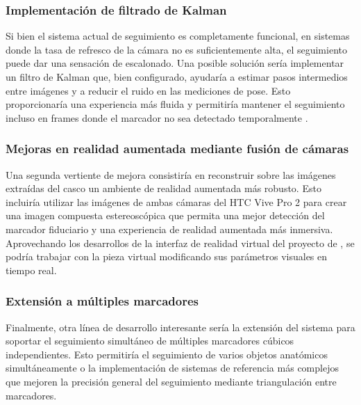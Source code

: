\subsubsection{Implementación de filtrado de Kalman}
Si bien el sistema actual de seguimiento es completamente funcional, en sistemas donde la tasa de refresco de la cámara no es suficientemente alta, el seguimiento puede dar una sensación de escalonado. Una posible solución sería implementar un filtro de Kalman que, bien configurado, ayudaría a estimar pasos intermedios entre imágenes y a reducir el ruido en las mediciones de pose. Esto proporcionaría una experiencia más fluida y permitiría mantener el seguimiento incluso en frames donde el marcador no sea detectado temporalmente \cite{welch2020kalman}.

\subsubsection{Mejoras en realidad aumentada mediante fusión de cámaras}
Una segunda vertiente de mejora consistiría en reconstruir sobre las imágenes extraídas del casco un ambiente de realidad aumentada más robusto. Esto incluiría utilizar las imágenes de ambas cámaras del HTC Vive Pro 2 para crear una imagen compuesta estereoscópica que permita una mejor detección del marcador fiduciario y una experiencia de realidad aumentada más inmersiva. Aprovechando los desarrollos de la interfaz de realidad virtual del proyecto de \citeauthor{IglesiasGuitian2022}, se podría trabajar con la pieza virtual modificando sus parámetros visuales en tiempo real.

\subsubsection{Extensión a múltiples marcadores}
Finalmente, otra línea de desarrollo interesante sería la extensión del sistema para soportar el seguimiento simultáneo de múltiples marcadores cúbicos independientes. Esto permitiría el seguimiento de varios objetos anatómicos simultáneamente o la implementación de sistemas de referencia más complejos que mejoren la precisión general del seguimiento mediante triangulación entre marcadores.